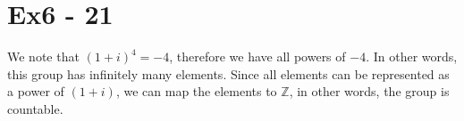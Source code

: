 \section*{Ex6 - 21}

We note that $ (1 + i)^4 = -4 $, therefore we have all powers of $ -4 $. In other words, this group has infinitely many elements. Since all elements can be represented as a power of $ (1 + i) $, we can map the elements to $ \mathbb{Z} $, in other words, the group is countable.